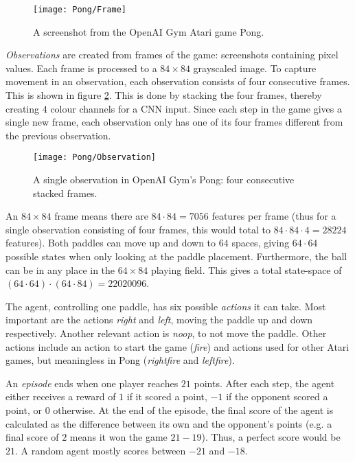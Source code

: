 \begin{figure}[h]
    \centering
    \texttt{[image: Pong/Frame]}
    \caption{A screenshot from the OpenAI Gym Atari game Pong.}
    \label{fig:pong-screen}
\end{figure}

\emph{Observations} are created from frames of the game: screenshots containing pixel values. Each frame is processed to a $84 \times 84$ grayscaled image. To capture movement in an observation, each observation consists of four consecutive frames. This is shown in figure \ref{fig:pong-obs}. This is done by stacking the four frames, thereby creating $4$ colour channels for a CNN input. Since each step in the game gives a single new frame, each observation only has one of its four frames different from the previous observation.

\begin{figure}[h]
    \centering
    \texttt{[image: Pong/Observation]}
    \caption{A single observation in OpenAI Gym's Pong: four consecutive stacked frames.}
    \label{fig:pong-obs}
\end{figure}

An $84 \times 84$ frame means there are $ 84 \cdot 84 = 7056$ features per frame (thus for a single observation consisting of four frames, this would total to $84 \cdot 84 \cdot 4 = 28224$ features). Both paddles can move up and down to $64$ spaces, giving $64 \cdot 64$ possible states when only looking at the paddle placement. Furthermore, the ball can be in any place in the $64 \times 84$ playing field. This gives a total state-space of $(64 \cdot 64) \cdot (64 \cdot 84) = 22020096$. 

The agent, controlling one paddle, has six possible \emph{actions} it can take. Most important are the actions \textit{right} and \textit{left}, moving the paddle up and down respectively. Another relevant action is \textit{noop}, to not move the paddle. Other actions include an action to start the game (\textit{fire}) and actions used for other Atari games, but meaningless in Pong (\textit{rightfire} and \textit{leftfire}). 

An \emph{episode} ends when one player reaches $21$ points. After each step, the agent either receives a reward of $1$ if it scored a point, $-1$ if the opponent scored a point, or $0$ otherwise. At the end of the episode, the final score of the agent is calculated as the difference between its own and the opponent's points (e.g. a final score of $2$ means it won the game $21 - 19$). Thus, a perfect score would be $21$. A random agent mostly scores between $-21$ and $-18$.

